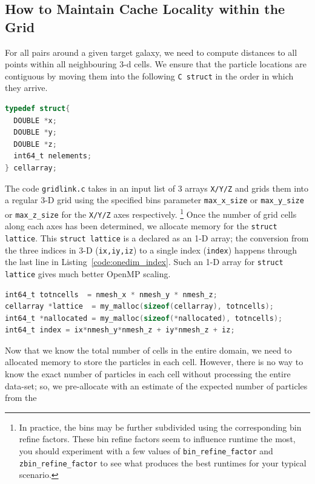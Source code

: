 \documentclass[12pt,titlepage,justified]{article}
\begin{document}
\subsection{How to Maintain Cache Locality within the Grid}
For all pairs around a given target galaxy, we need to compute distances to all points within all neighbouring 3-d cells.
We ensure that the particle locations are contiguous by moving them into the following \texttt{C struct} in the order in which they arrive.
\begin{lstlisting}[language=C,numbers=none,label={code:celldefn},caption={Definition of the cellarray structure. This 
structure contains the \texttt{X/Y/Z} positions of all the particles that are in one 3-D cell. }]
typedef struct{
  DOUBLE *x;
  DOUBLE *y;
  DOUBLE *z;
  int64_t nelements;
} cellarray;
\end{lstlisting}
The code \texttt{gridlink.c} takes in an input list of 3 arrays \texttt{X/Y/Z} and grids them into a regular 3-D grid using the specified bins parameter
\texttt{max\_x\_size} or \texttt{max\_y\_size} or \texttt{max\_z\_size} for the \texttt{X/Y/Z} axes respectively. \footnote{In practice, the bins may be further 
subdivided using the corresponding bin refine factors. These bin refine factors seem to influence runtime the most, you should experiment with a few values of 
\texttt{bin\_refine\_factor} and \texttt{zbin\_refine\_factor} to see what produces the best runtimes for your typical scenario.}
Once the number of grid cells along each axes has been determined, we allocate memory for the \texttt{struct lattice}. This \texttt{struct lattice} is a 
declared as an 1-D array; the conversion from the three indices in 3-D (\texttt{ix,iy,iz}) to a single index (\texttt{index}) happens through the last 
line in Listing~\ref{code:onedim_index}. Such an 1-D array for \texttt{struct lattice} gives much better OpenMP scaling.   
\begin{lstlisting}[language=C,numbers=none,label={code:onedim_index},caption={Accessing as \texttt{lattice[index]} rather than \texttt{lattice[ix][iy][iz]}.},basicstyle=\scriptsize]
int64_t totncells  = nmesh_x * nmesh_y * nmesh_z;
cellarray *lattice  = my_malloc(sizeof(cellarray), totncells);
int64_t *nallocated = my_malloc(sizeof(*nallocated), totncells);
int64_t index = ix*nmesh_y*nmesh_z + iy*nmesh_z + iz;
\end{lstlisting}
Now that we know the total number of cells in the entire domain, we need to allocated memory to store the particles in each cell. However, there is no way to 
know the exact number of particles in each cell without processing the entire data-set; so, we pre-allocate with an estimate of the expected number of particles from the 
\end{document}
